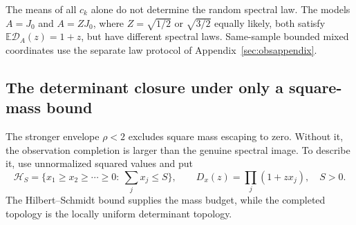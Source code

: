 \documentclass[11pt,a4paper]{amsart}
\numberwithin{equation}{section}
\theoremstyle{definition}
\theoremstyle{remark}
\newcommand{\E}{\mathbb E}
\begin{document}
The means of all $c_k$ alone do not determine the random spectral law. The models $A=J_0$ and $A=ZJ_0$, where $Z=\sqrt{1/2}$ or $\sqrt{3/2}$ equally likely, both satisfy $\E\mathscr D_A(z)=1+z$, but have different spectral laws. Same-sample bounded mixed coordinates use the separate law protocol of Appendix~\ref{sec:obsappendix}.

\subsection{The determinant closure under only a square-mass bound}
The stronger envelope $\rho<2$ excludes square mass escaping to zero. Without it, the observation completion is larger than the genuine spectral image. To describe it, use unnormalized squared values and put
\[
 \mathcal H_S=\{x_1\ge x_2\ge\cdots\ge0:\ \sum_jx_j\le S\},\qquad
 D_x(z)=\prod_j(1+zx_j),\quad S>0.
\]
The Hilbert--Schmidt bound supplies the mass budget, while the completed topology is the locally uniform determinant topology.
\end{document}

